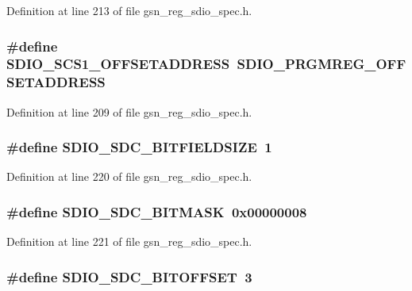 Definition at line 213 of file gsn\_\-reg\_\-sdio\_\-spec.h.

\hypertarget{a00571_a6736f75e58b215040910efd6c9e46415}{
\subsubsection[{SDIO\_\-SCS1\_\-OFFSETADDRESS}]{\setlength{\rightskip}{0pt plus 5cm}\#define SDIO\_\-SCS1\_\-OFFSETADDRESS~SDIO\_\-PRGMREG\_\-OFFSETADDRESS}}
\label{a00571_a6736f75e58b215040910efd6c9e46415}


Definition at line 209 of file gsn\_\-reg\_\-sdio\_\-spec.h.

\hypertarget{a00571_a46441513d415503010ae841b5ddd61f9}{
\subsubsection[{SDIO\_\-SDC\_\-BITFIELDSIZE}]{\setlength{\rightskip}{0pt plus 5cm}\#define SDIO\_\-SDC\_\-BITFIELDSIZE~1}}
\label{a00571_a46441513d415503010ae841b5ddd61f9}


Definition at line 220 of file gsn\_\-reg\_\-sdio\_\-spec.h.

\hypertarget{a00571_aa0afcd407d0c6c147d239f3586ca94cd}{
\subsubsection[{SDIO\_\-SDC\_\-BITMASK}]{\setlength{\rightskip}{0pt plus 5cm}\#define SDIO\_\-SDC\_\-BITMASK~0x00000008}}
\label{a00571_aa0afcd407d0c6c147d239f3586ca94cd}


Definition at line 221 of file gsn\_\-reg\_\-sdio\_\-spec.h.

\hypertarget{a00571_a7f338e587b5448250d3abf885b1ac294}{
\subsubsection[{SDIO\_\-SDC\_\-BITOFFSET}]{\setlength{\rightskip}{0pt plus 5cm}\#define SDIO\_\-SDC\_\-BITOFFSET~3}}
\label{a00571_a7f338e587b5448250d3abf885b1ac294}


